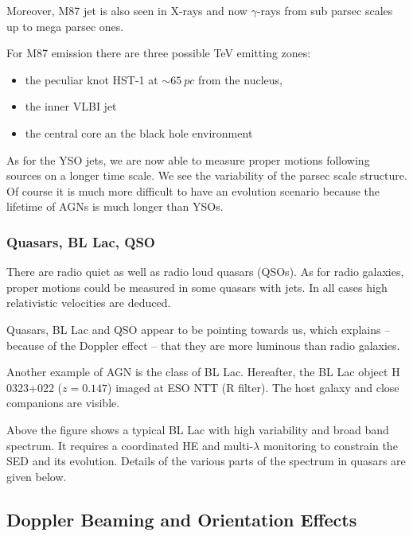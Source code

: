 \documentclass[10pt,a4paper,english]{article}
\begin{document}
Moreover, M87 jet is also seen in X-rays and now $\gamma$-rays from sub parsec scales up to mega parsec ones.


For M87 emission there are three possible \si{TeV} emitting zones:
\begin{itemize}
\item the peculiar knot HST-1 at $\sim \SI{65}{pc}$ from the nucleus,
\item the inner VLBI jet
\item the central core an the black hole environment
\end{itemize}
As for the YSO jets, we are now able to measure proper motions following sources on a longer time scale. We see the variability of the parsec scale structure. Of course it is much more difficult to have an evolution scenario because the lifetime of AGNs is much longer than YSOs.
\subsubsection{Quasars, BL Lac, QSO}
There are radio quiet as well as radio loud quasars (QSOs). As for
radio galaxies, proper motions could be measured in some quasars with
jets. In all cases high relativistic velocities are deduced.

Quasars, BL Lac and QSO appear to be pointing towards us, which
explains -- because of the Doppler effect -- that they are more
luminous than radio galaxies.


Another example of AGN is the class of BL Lac. Hereafter, the BL Lac
object H 0323+022 ($z = 0.147$) imaged at ESO NTT (R filter). The host
galaxy and close companions are visible.

Above the figure shows a typical BL Lac with high variability and
broad band spectrum. It requires a coordinated HE and multi-$\lambda$
monitoring to constrain the SED and its evolution. Details of the
various parts of the spectrum in quasars are given below.
\subsection{Doppler Beaming and Orientation Effects}
\end{document}
